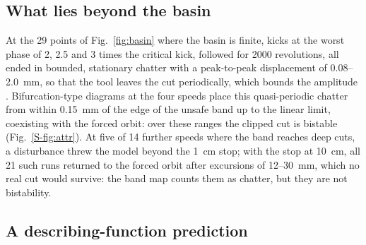\subsection{What lies beyond the basin}\label{sec:bistab-attr}

At the 29 points of Fig.~\ref{fig:basin} where the basin is finite, kicks at the worst phase of 2, 2.5 and 3 times the critical kick, followed for 2000 revolutions, all ended in bounded, stationary chatter with a peak-to-peak displacement of 0.08--\SI{2.0}{\milli\metre}, so that the tool leaves the cut periodically, which bounds the amplitude \citep{tlusty1981basic}. Bifurcation-type diagrams at the four speeds place this quasi-periodic chatter from within \SI{0.15}{\milli\metre} of the edge of the unsafe band up to the linear limit, coexisting with the forced orbit: over these ranges the clipped cut is bistable (Fig.~\ref{S-fig:attr}). At five of 14 further speeds where the band reaches deep cuts, a disturbance threw the model beyond the \SI{1}{\centi\metre} stop; with the stop at \SI{10}{\centi\metre}, all 21 such runs returned to the forced orbit after excursions of 12--\SI{30}{\milli\metre}, which no real cut would survive: the band map counts them as chatter, but they are not bistability.

\subsection{A describing-function prediction}\label{sec:bistab-df}

